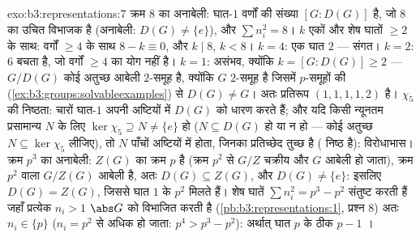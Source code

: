 \begin{solution}{exo:b3:representations:7}
क्रम $8$ का अनाबेली: घात-$1$ वर्णों की संख्या $[G : D(G)]$ है, जो $8$
का उचित विभाजक है (अनाबेली: $D(G) \neq
\{e\}$), और $\sum n_i^2 = 8$। $k$ एकों और शेष
घातों $\geq 2$ के साथ: वर्गों $\geq 4$ के साथ $8 - k \equiv 0$, और $k
\mid 8$, $k < 8$।
$k = 4$: एक घात $2$ --- संगत। $k =
2$: $6$ बचता है, जो वर्गों $\geq 4$
का योग नहीं है। $k = 1$: असंभव, क्योंकि $k = [G : D(G)] \geq 2$ --- $G/D(G)$ कोई अतुच्छ
आबेली $2$-समूह है, क्योंकि $G$ $2$-समूह है जिसमें $p$-समूहों
की  (\cref{ex:b3:groups:solvableexamples}) से $D(G) \neq G$। अतः प्रतिरूप $(1,1,1,1,2)$ है। $\chi_5$ की निष्ठता:
चारों घात-$1$  अपनी अष्टियों में $D(G)$ को धारण करते हैं; और
यदि किसी न्यूनतम प्रसामान्य $N$ के लिए $\ker\chi_5
\supseteq N \neq \{e\}$ हो ($N
\subseteq D(G)$ हो या न
हो --- कोई अतुच्छ $N \subseteq \ker\chi_5$ लीजिए), तो $N$ पाँचों अष्टियों में होता,
जिनका प्रतिच्छेद तुच्छ है ( निष्ठ है): विरोधाभास। क्रम
$p^3$ का अनाबेली: $Z(G)$ का क्रम $p$ है (क्रम $p^2$ से $G/Z$ चक्रीय
और $G$ आबेली हो जाता), क्रम $p^2$ वाला $G/Z(G)$ आबेली है, अतः $D(G) \subseteq Z(G)$,
और $D(G) \ne \{e\}$: इसलिए $D(G) = Z(G)$, जिससे घात $1$ के $p^2$  मिलते हैं। शेष
घातें $\sum n_i^2 = p^3 -
p^2$ संतुष्ट करती हैं जहाँ प्रत्येक $n_i > 1$ $\abs G$ को विभाजित
करती है (\cref{pb:b3:representations:1}, प्रश्न 8) अतः $n_i \in
\{p\}$ ($n_i = p^2$ से अधिक हो जाता: $p^4 > p^3 - p^2$):
अर्थात् घात $p$ के ठीक $p
- 1$ ।
\end{solution}

